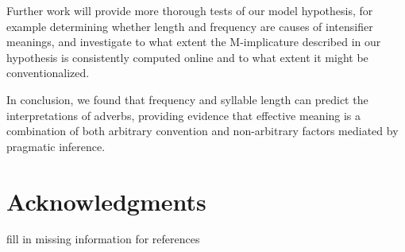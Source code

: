 \documentclass[10pt,letterpaper]{article}
\newcommand{\todo}[1]{{\color{red}#1}}
\begin{document}
Further work will provide more thorough tests of our model hypothesis, for example determining whether length and frequency are causes of intensifier meanings, and investigate to what extent the M-implicature described in our hypothesis is consistently computed online and to what extent it might be conventionalized.





In conclusion, we found that frequency and syllable length can predict the interpretations of adverbs, %
providing evidence that effective meaning is a combination of both arbitrary convention and non-arbitrary factors mediated by pragmatic inference.






\section{Acknowledgments}



\todo{fill in missing information for references}

\setlength{\bibleftmargin}{.125in}
\setlength{\bibindent}{-\bibleftmargin}


\end{document}
